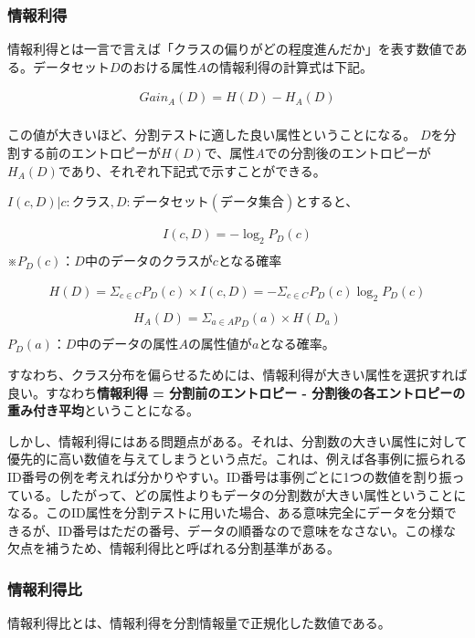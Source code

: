 \documentclass[dvipdfmx]{jsarticle}
\begin{document}
\subsubsection{情報利得}
情報利得とは一言で言えば「クラスの偏りがどの程度進んだか」を表す数値である。データセット$D$のおける属性$A$の情報利得の計算式は下記。
\begin{center}
  \begin{align*}
    Gain_{A}(D) = H(D) - H_{A}(D) \\
  \end{align*}
\end{center}
この値が大きいほど、分割テストに適した良い属性ということになる。
$D$を分割する前のエントロピーが$H(D)$で、属性$A$での分割後のエントロピーが$H_{A}(D)$であり、それぞれ下記式で示すことができる。
\begin{center}
  $I(c, D)|c:クラス, D:データセット(データ集合)$とすると、
  \begin{center}
    \begin{align*}
      I(c, D) = -\log_2 P_{D}(c) \\
    \end{align*}
    ※$P_{D}(c)$：$D$中のデータのクラスが$c$となる確率
  \end{center}
  \begin{align*}
    H(D)=\Sigma_{c \in C}P_{D}(c) \times I(c, D)=-\Sigma_{c \in C}P_{D}(c)\log_2 P_{D}(c) \\
  \end{align*}
  \begin{align*}
    H_{A}(D)=\Sigma_{a \in A}p_{D}(a) \times H(D_{a}) \\
  \end{align*}
  $P_{D}(a)$：$D$中のデータの属性$A$の属性値が$a$となる確率。
\end{center}
すなわち、クラス分布を偏らせるためには、情報利得が大きい属性を選択すれば良い。すなわち\textbf{情報利得 = 分割前のエントロピー - 分割後の各エントロピーの重み付き平均}ということになる。\par
しかし、情報利得にはある問題点がある。それは、分割数の大きい属性に対して優先的に高い数値を与えてしまうという点だ。これは、例えば各事例に振られるID番号の例を考えれば分かりやすい。ID番号は事例ごとに1つの数値を割り振っている。したがって、どの属性よりもデータの分割数が大きい属性ということになる。このID属性を分割テストに用いた場合、ある意味完全にデータを分類できるが、ID番号はただの番号、データの順番なので意味をなさない。この様な欠点を補うため、情報利得比と呼ばれる分割基準がある。
\subsubsection{情報利得比}
情報利得比とは、情報利得を分割情報量で正規化した数値である。
\end{document}
